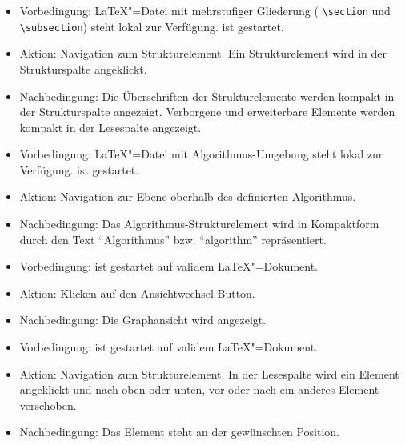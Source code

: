 \begin{itemize}
  \item Vorbedingung: \LaTeX"=Datei mit mehrstufiger Gliederung (\zB{} \verb|\section| und \verb|\subsection|) steht
  lokal zur Verfügung.
  \texla{} ist gestartet.
  \item Aktion: Navigation zum Strukturelement.
  Ein Strukturelement wird in der Strukturspalte angeklickt.
  \item Nachbedingung: Die Überschriften der Strukturelemente werden kompakt in der Strukturspalte angezeigt.
  Verborgene und erweiterbare Elemente werden kompakt in der Lesespalte angezeigt.
\end{itemize}

\begin{itemize}
  \item Vorbedingung: \LaTeX"=Datei mit Algorithmus-Umgebung steht lokal zur Verfügung.
  \texla{} ist gestartet.
  \item Aktion: Navigation zur Ebene oberhalb des definierten Algorithmus.
  \item Nachbedingung: Das Algorithmus-Strukturelement wird in Kompaktform durch den Text \enquote{Algorithmus} bzw.
  \enquote{algorithm} repräsentiert.
\end{itemize}

\begin{itemize}
  \item Vorbedingung: \texla{} ist gestartet auf validem \LaTeX"=Dokument.
  \item Aktion: Klicken auf den Ansichtwechsel-Button.
  \item Nachbedingung: Die Graphansicht wird angezeigt.
\end{itemize}

\begin{itemize}
  \item Vorbedingung: \texla{} ist gestartet auf validem \LaTeX"=Dokument.
  \item Aktion: Navigation zum Strukturelement.
  In der Lesespalte wird ein Element angeklickt und nach oben oder unten, vor oder nach ein anderes Element
  verschoben.
  \item Nachbedingung: Das Element steht an der gewünschten Position.
\end{itemize}

